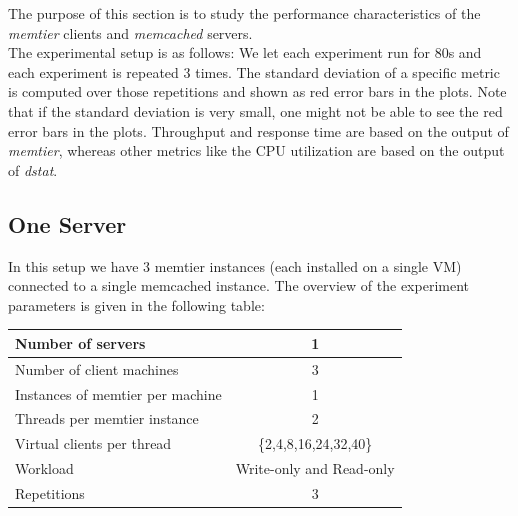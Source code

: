 
The purpose of this section is to study the performance characteristics of the \textit{memtier} clients and \textit{memcached} servers. \\
The experimental setup is as follows: We let each experiment run for 80s and each experiment is repeated 3 times. The standard deviation of a specific metric is computed over those repetitions and shown as red error bars in the plots. Note that if the standard deviation is very small, one might not be able to see the red error bars in the plots. Throughput and response time are based on the output of \textit{memtier}, whereas other metrics like the CPU utilization are based on the output of \textit{dstat}. 

\subsection{One Server}
In this setup we have 3 memtier instances (each installed on a single VM) connected to a single memcached instance. The overview of the experiment parameters is given in the following table:
\begin{center}
	\scriptsize{
		\begin{tabular}{|l|c|}
			\hline Number of servers                & 1                        \\ 
			\hline Number of client machines        & 3                        \\ 
			\hline Instances of memtier per machine & 1                        \\ 
			\hline Threads per memtier instance     & 2                        \\
			\hline Virtual clients per thread       & \{2,4,8,16,24,32,40\} \\ 
			\hline Workload                         & Write-only and Read-only \\
			\hline Repetitions                      & 3                        \\ 
			\hline 
		\end{tabular}
	} 
\end{center}

